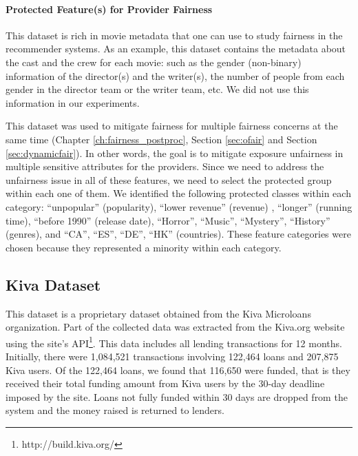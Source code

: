         \vspace{0.25cm}
        \noindent \paragraph{Protected Feature(s) for Provider Fairness}
        \vspace{0.25cm}

            This dataset is rich in movie metadata that one can use to study fairness in the recommender systems. As an example, this dataset contains the metadata about the cast and the crew for each movie: such as the gender (non-binary) information of the director(s) and the writer(s), the number of people from each gender in the director team or the writer team, etc. We did not use this information in our experiments.
            
            This dataset was used to mitigate fairness for multiple fairness concerns at the same time (Chapter \ref{ch:fairness_postproc}, Section \ref{sec:ofair} and Section \ref{sec:dynamicfair}). In other words, the goal is to mitigate exposure unfairness in multiple sensitive attributes for the providers. Since we need to address the unfairness issue in all of these features, we need to select the protected group within each one of them. We identified the following protected classes within each category: ``unpopular'' (popularity), ``lower revenue'' (revenue) , ``longer'' (running time), ``before 1990'' (release date), ``Horror'', ``Music'', ``Mystery'', ``History'' (genres), and ``CA'', ``ES'', ``DE'', ``HK'' (countries). These feature categories were chosen because they represented a minority within each category.

    \subsection{Kiva Dataset}
    
    This dataset is a proprietary dataset obtained from the Kiva Microloans organization. Part of the collected data was extracted from the Kiva.org website using the site's API\footnote{http://build.kiva.org/}. This data includes all lending transactions for 12 months. Initially, there were 1,084,521 transactions involving 122,464 loans and 207,875 Kiva users. Of the 122,464 loans, we found that 116,650 were funded, that is they received their total funding amount from Kiva users by the 30-day deadline imposed by the site. Loans not fully funded within 30 days are dropped from the system and the money raised is returned to lenders.
    
